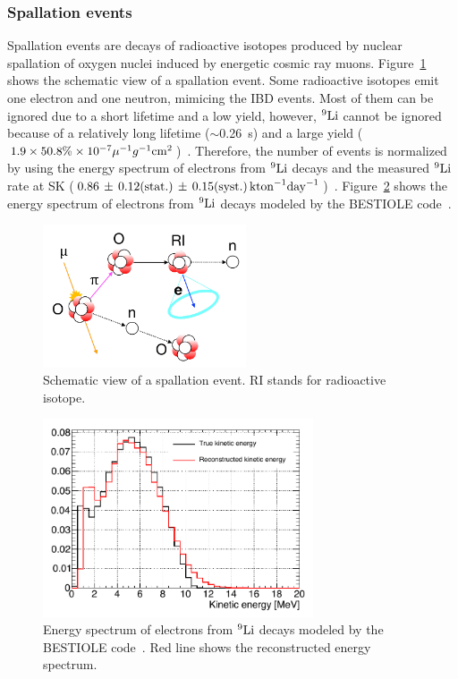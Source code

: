 \subsubsection{Spallation events}\label{Subsubsec_sim_spa}
\vs\hs
Spallation events are decays of radioactive isotopes produced by nuclear spallation of oxygen nuclei induced by energetic cosmic ray muons.
Figure~\ref{Simulation_Spallation_event} shows the schematic view of a spallation event.
Some radioactive isotopes emit one electron and one neutron, mimicing the IBD events.
Most of them can be ignored due to a short lifetime and a low yield, however, $^{9}{\rm Li}$ cannot be ignored because of a relatively long lifetime ($\sim$0.26~s) and a large yield ($1.9 \times 50.8\% \times 10^{-7} \mu^{-1}g^{-1}{\rm cm}^{2}$)~\cite{2007Battistoni}.
Therefore, the number of events is normalized by using the energy spectrum of electrons from $^{9}{\rm Li}$ decays and the measured $^{9}{\rm Li}$ rate at SK ($0.86\,\pm\,0.12 ({\rm stat.})\,\pm\,0.15 ({\rm syst.})\,{\rm kton}^{-1}{\rm day}^{-1}$)~\cite{2015Zhang}.
Figure~\ref{9Li_ene} shows the energy spectrum of electrons from $^{9}{\rm Li}$ decays modeled by the BESTIOLE code~\cite{2010ThomasPhD}.

\begin{figure}[H]
	\centering
	\includegraphics[width=6cm]{Figures/Simulation/Spallation_event}
	\caption[Schematic view of a spallation event]{
	Schematic view of a spallation event.
	RI stands for radioactive isotope.
	}\label{Simulation_Spallation_event}
\end{figure}

\begin{figure}[H]
	\centering
	\includegraphics[width=8cm]{Figures/Simulation/9Li_ene}
	\caption[Energy spectrum of electrons from $^{9}{\rm Li}$ decays modeled by the BESTIOLE code]{
	Energy spectrum of electrons from $^{9}{\rm Li}$ decays modeled by the BESTIOLE code~\cite{2010ThomasPhD,2023HaradaPhD}.
	Red line shows the reconstructed energy spectrum.
	}\label{9Li_ene}
\end{figure}

